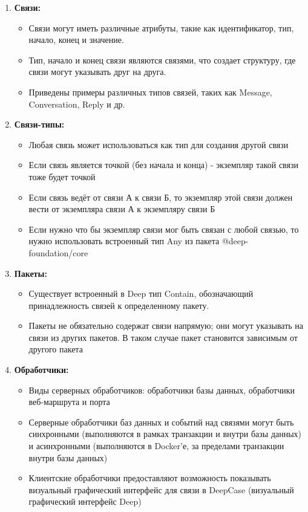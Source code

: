 \documentclass{article}
\begin{document}
\begin{enumerate}
  \item \textbf{Связи:}
        \begin{itemize}
          \item Связи могут иметь различные атрибуты, такие как идентификатор,
                тип, начало, конец и значение.
          \item Тип, начало и конец связи являются связями, что создает
                структуру, где связи могут указывать друг на друга.
          \item Приведены примеры различных типов связей, таких как Message,
                Conversation, Reply и др.
        \end{itemize}

  \item \textbf{Связи-типы:}
        \begin{itemize}
          \item Любая связь может использоваться как тип для создания другой
                связи
          \item Если связь является точкой (без начала и конца) - экземпляр
                такой связи тоже будет точкой
          \item Если связь ведёт от связи А к связи Б, то экземпляр этой связи
                должен вести от экземпляра связи А к экземпляру связи Б
          \item Если нужно что бы экземпляр связи мог быть связан с любой
                связью,
                то нужно использовать встроенный тип Any из пакета
                @deep-foundation/core
        \end{itemize}

  \item \textbf{Пакеты:}
        \begin{itemize}
          \item Существует встроенный в Deep тип Contain, обозначающий
                принадлежность связей к определенному пакету.
          \item Пакеты не обязательно содержат связи напрямую; они могут
                указывать на связи из других пакетов. В таком случае пакет становится зависимым от другого пакета
        \end{itemize}

  \item \textbf{Обработчики:}
        \begin{itemize}
          \item Виды серверных обработчиков: обработчики базы данных,
                обработчики веб-маршрута и порта
          \item Серверные обработчики баз данных и событий над связями могут быть синхронными (выполняются в рамках транзакции и внутри базы данных) и асинхронными (выполняются в Docker'е, за пределами транзакции внутри базы данных)
          \item Клиентские обработчики предоставляют возможность показывать
                визуальный графический интерфейс для связи в DeepCase
                (визуальный графический
                интерфейс Deep)
        \end{itemize}


\end{enumerate}
\end{document}
